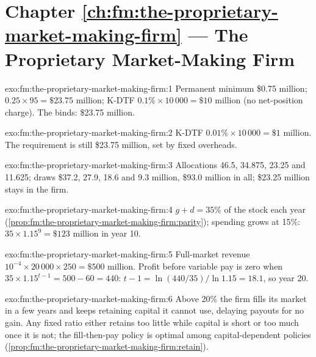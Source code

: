 \section*{Chapter \ref{ch:fm:the-proprietary-market-making-firm} --- The Proprietary Market-Making Firm}

\begin{solution}{exo:fm:the-proprietary-market-making-firm:1}
Permanent minimum \$0.75 million;  $0.25\times95=\$23.75$ million; K-DTF $0.1\%\times10\,000=\$10$ million (no
net-position charge). The  binds: \$23.75 million.
\end{solution}

\begin{solution}{exo:fm:the-proprietary-market-making-firm:2}
K-DTF $0.01\%\times10\,000=\$1$ million. The requirement is still \$23.75 million, set by fixed overheads.
\end{solution}

\begin{solution}{exo:fm:the-proprietary-market-making-firm:3}
Allocations 46.5, 34.875, 23.25 and 11.625; draws \$37.2, 27.9, 18.6 and 9.3 million, \$93.0 million in all; \$23.25 million stays in the firm.
\end{solution}

\begin{solution}{exo:fm:the-proprietary-market-making-firm:4}
$g+d=35\%$ of the stock each year (\cref{prop:fm:the-proprietary-market-making-firm:parity}); spending grows at 15\%: $35\times1.15^9=\$123$
million in year 10.
\end{solution}

\begin{solution}{exo:fm:the-proprietary-market-making-firm:5}
Full-market revenue $10^{-4}\times20\,000\times250=\$500$ million. Profit before variable pay is zero when $35\times1.15^{t-1}=500-60=440$:
$t-1=\ln(440/35)/\ln1.15=18.1$, so year 20.
\end{solution}

\begin{solution}{exo:fm:the-proprietary-market-making-firm:6}
Above 20\% the firm fills its market in a few years and keeps retaining capital it cannot use, delaying payouts for no gain. Any fixed ratio either
retains too little while capital is short or too much once it is not; the fill-then-pay policy is optimal among capital-dependent policies
(\cref{prop:fm:the-proprietary-market-making-firm:retain}).
\end{solution}


